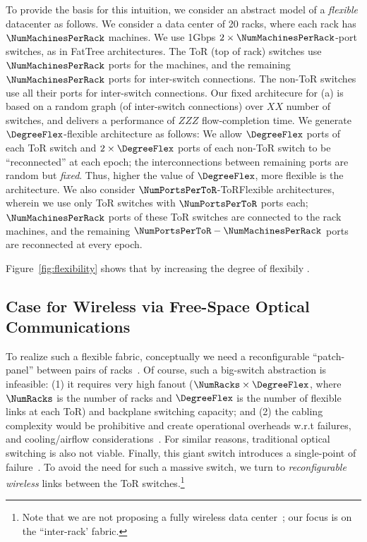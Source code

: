  To provide the basis for this intuition, we consider an abstract 
 model of a {\em flexible} datacenter as follows.  We consider a data center 
of 20 racks, where each rack has $\NumMachinesPerRack$ machines. We use 1Gbps $2\times \NumMachinesPerRack$-port
switches, as in FatTree architectures.  The ToR (top of rack) switches
 use $\NumMachinesPerRack$ ports for the machines, and the remaining $\NumMachinesPerRack$ ports for
inter-switch connections. The non-ToR switches use all their ports for
inter-switch connections. Our fixed architecure for (a) is based on a
random graph (of inter-switch connections) over $XX$ number of
switches, and delivers a performance of $ZZZ$ flow-completion time.
We generate $\DegreeFlex$-flexible architecture as follows: We allow $\DegreeFlex$ ports
of each ToR switch and $2\times\DegreeFlex$ ports of each non-ToR switch to be
``reconnected'' at each epoch; the interconnections between remaining
ports are random but {\em fixed}. Thus, higher the value of $\DegreeFlex$, more
flexible is the architecture. We also consider $\NumPortsPerToR$-ToRFlexible
architectures, wherein we use only ToR switches with $\NumPortsPerToR$ ports each;
 $\NumMachinesPerRack$ ports of these ToR switches are connected to the rack machines, 
and the remaining $\NumPortsPerToR-\NumMachinesPerRack$ ports are reconnected at every epoch.


 Figure~\ref{fig:flexibility} shows that by increasing the degree of flexibily \plsfill.

\subsection{Case for Wireless via Free-Space Optical Communications}
 To realize such a flexible fabric, conceptually we need
a reconfigurable ``patch-panel''  between  pairs of racks~\cite{sdnpatch}. Of
course, such a big-switch abstraction is infeasible: (1) it requires very high
fanout ($\NumRacks \times \DegreeFlex$, where $\NumRacks$ is the number of
racks and $\DegreeFlex$ is the number of flexible links at each ToR) and
backplane  switching capacity; and (2)
the  cabling complexity  would be prohibitive and create
operational overheads w.r.t failures, and cooling/airflow
considerations~\cite{}.  For similar reasons, traditional optical
 switching is also not viable.  Finally, this giant switch 
  introduces a single-point of failure~\cite{osa,proteus,helios}. 
 To avoid the need for such a massive switch, 
 we turn to  {\em reconfigurable wireless} links between the  ToR switches.\footnote{Note that we are not proposing a fully wireless data center~\cite{cornell}; our focus is on the ``inter-rack'
fabric.}

